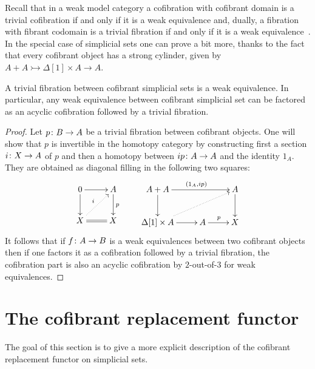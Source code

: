 \documentclass[reqno,10pt,a4paper,oneside,draft]{amsart}
\begin{document}
Recall that in a weak model category  a  cofibration with cofibrant domain is a trivial cofibration if and only if it is a weak equivalence and, dually,  a fibration with fibrant codomain is a trivial fibration if and only if it is a  weak equivalence~\cite[Proposition 2.2.9]{henry2018wms}. In the special case of simplicial sets one can prove a bit more,
thanks to the fact that every cofibrant object has a strong cylinder, given by~$A + A \rightarrowtail \Delta[1] \times A \rightarrow A$.
 


\begin{lemma}\label{lemma:triv_fib_are_we}
A trivial fibration between cofibrant simplicial sets is a weak equivalence.
In particular, any weak equivalence between cofibrant simplicial set can be factored as an acyclic cofibration followed by a trivial fibration.
\end{lemma}

\begin{proof}
Let $p \colon B \to A$ be a trivial fibration between cofibrant objects. One will show that $p$ is invertible in the homotopy category by constructing first a section $i \colon X \rightarrow A$ of $p$ and then a homotopy between $i  p \colon A \to A$ and the identity $1_{A}$. They are obtained as diagonal filling in the following two squares:
\[
\xymatrix{0 \ar[r] \ar[d] & A \ar[d]^{p} \\ 
X \ar@{.>}[ur]^{i} \ar@{=}[r] & X}
\qquad
\xymatrix{A + A \ar[rr]^{(1_{A} , i  p)} \ar[d] & &  A \ar[d] \\ \Delta[1] \times A \ar@{.>}[rru] \ar[r]& A \ar[r]^{p} & X  }
\]
It follows that if $f \colon A \rightarrow B$ is a weak equivalences between two cofibrant objects then if one factors it as a cofibration followed by a trivial fibration, the cofibration part is also an acyclic cofibration by $2$-out-of-$3$ for weak equivalences.
\end{proof}






 
\section{The cofibrant replacement functor}

The goal of this section is to give a more explicit description of the cofibrant replacement functor on simplicial sets.
\end{document}
